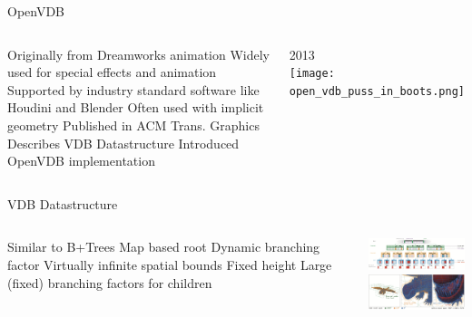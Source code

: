 \placelogofalse
\begin{frame}{OpenVDB}
\begin{columns}
\centering
\begin{outline}
    \1 Originally from Dreamworks animation
    \1 Widely used for special effects and animation
      \2 Supported by industry standard software like Houdini and Blender
    \1 Often used with implicit geometry
    \1 Published in ACM Trans. Graphics
    \2 Describes VDB Datastructure
    \2 Introduced OpenVDB implementation
\end{outline}

\centering
{}
2013 \cite{Museth2013}\\
\vspace{0.5cm}
\texttt{[image: open\_vdb\_puss\_in\_boots.png]} 
\end{columns}
\end{frame}
\placelogotrue

\begin{frame}{VDB Datastructure}
\begin{columns}
\centering
\begin{outline}
    \1 Similar to B+Trees
    \1 Map based root 
      \2 Dynamic branching factor
      \2 Virtually infinite spatial bounds
    \1 Fixed height
    \1 Large (fixed) branching factors for children
\end{outline}

\centering
\includegraphics[width=7.0cm]{open_vdb_data_structure.png} \\
\vspace{0.5cm}
\includegraphics[width=7.0cm]{open_vdb_visual_aid.png} 
\end{columns}
\end{frame}
